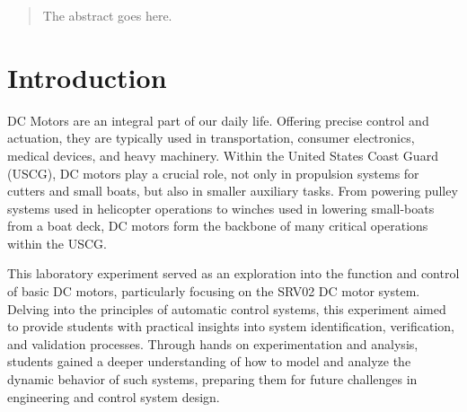 \documentclass[conference,compsoc]{IEEEtran}
\begin{document}




\maketitle

\begin{abstract}
The abstract goes here.
\end{abstract}





%
\IEEEpeerreviewmaketitle



\section{Introduction}
DC Motors are an integral part of our daily life. Offering precise control and actuation, they are typically used in transportation, consumer electronics, medical devices, and heavy machinery. Within the United States Coast Guard (USCG), DC motors play a crucial role, not only in propulsion systems for cutters and small boats, but also in smaller auxiliary tasks. From powering pulley systems used in helicopter operations to winches used in lowering small-boats from a boat deck, DC motors form the backbone of many critical operations within the USCG.

This laboratory experiment served as an exploration into the function and control of basic DC motors, particularly focusing on the SRV02 DC motor system. Delving into the principles of automatic control systems, this experiment aimed to provide students with practical insights into system identification, verification, and validation processes. Through hands on experimentation and analysis, students gained a deeper understanding of how to model and analyze the dynamic behavior of such systems, preparing them for future challenges in engineering and control system design.
\end{document}
